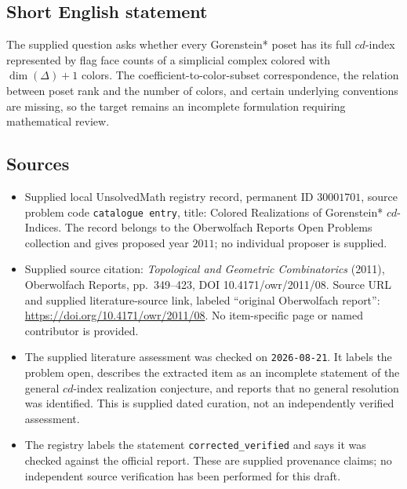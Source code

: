 \documentclass[11pt]{article}
\begin{document}
\subsection{Short English statement}
The supplied question asks whether every Gorenstein* poset has its full $cd$-index represented by flag face counts of a simplicial complex colored with $\dim(\Delta)+1$ colors. The coefficient-to-color-subset correspondence, the relation between poset rank and the number of colors, and certain underlying conventions are missing, so the target remains an incomplete formulation requiring mathematical review.
\subsection{Sources}
\begin{itemize}
\item Supplied local UnsolvedMath registry record, permanent ID $30001701$, source problem code \texttt{catalogue entry}, title: Colored Realizations of Gorenstein* $cd$-Indices. The record belongs to the Oberwolfach Reports Open Problems collection and gives proposed year $2011$; no individual proposer is supplied.
\item Supplied source citation: \emph{Topological and Geometric Combinatorics} (2011), Oberwolfach Reports, pp.~349--423, DOI 10.4171/owr/2011/08. Source URL and supplied literature-source link, labeled ``original Oberwolfach report'': \url{https://doi.org/10.4171/owr/2011/08}. No item-specific page or named contributor is provided.
\item The supplied literature assessment was checked on \texttt{2026-08-21}. It labels the problem open, describes the extracted item as an incomplete statement of the general $cd$-index realization conjecture, and reports that no general resolution was identified. This is supplied dated curation, not an independently verified assessment.
\item The registry labels the statement \texttt{corrected\_verified} and says it was checked against the official report. These are supplied provenance claims; no independent source verification has been performed for this draft.
\end{itemize}
\end{document}

